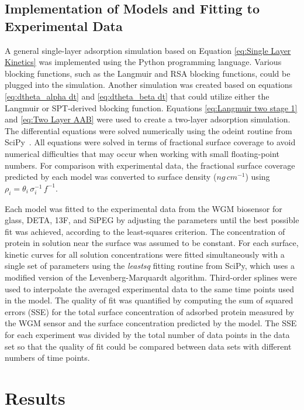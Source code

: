 \subsection{Implementation of Models and Fitting to Experimental Data}

A general single-layer adsorption simulation based on Equation \ref{eq:Single Layer Kinetics}
was implemented using the Python programming language. Various blocking
functions, such as the Langmuir and RSA blocking functions, could
be plugged into the simulation. Another simulation was created based
on equations \ref{eq:dtheta_alpha dt} and \ref{eq:dtheta_beta dt}
that could utilize either the Langmuir or SPT-derived blocking function.
Equations \ref{eq:Langmuir two stage 1} and \ref{eq:Two Layer AAB}
were used to create a two-layer adsorption simulation. The differential
equations were solved numerically using the odeint routine from SciPy~\cite{Jones2001-}.
All equations were solved in terms of fractional surface coverage
to avoid numerical difficulties that may occur when working with small
floating-point numbers. For comparison with experimental data, the
fractional surface coverage predicted by each model was converted
to surface density ($ng\, cm^{-1}$) using $\rho_{i}=\theta_{i}\,\sigma_{i}^{-1}\, f^{-1}$. 

Each model was fitted to the experimental data from the WGM biosensor
for glass, DETA, 13F, and SiPEG by adjusting the parameters until
the best possible fit was achieved, according to the least-squares
criterion. The concentration of protein in solution near the surface
was assumed to be constant. For each surface, kinetic curves for all
solution concentrations were fitted simultaneously with a single set
of parameters using the \emph{leastsq} fitting routine from SciPy,
which uses a modified version of the Levenberg-Marquardt algorithm.
Third-order splines were used to interpolate the averaged experimental
data to the same time points used in the model. The quality of fit
was quantified by computing the sum of squared errors (SSE) for the
total surface concentration of adsorbed protein measured by the WGM
sensor and the surface concentration predicted by the model. The SSE
for each experiment was divided by the total number of data points
in the data set so that the quality of fit could be compared between
data sets with different numbers of time points. 


\section{Results}

